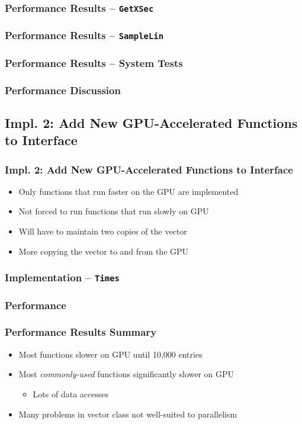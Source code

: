 \documentclass{beamer}
\newcommand{\textapprox}{\raisebox{0.5ex}{\texttildelow}}
\newcommand\pro{\item[$+$]}
\newcommand\con{\item[$-$]}
\begin{document}
\begin{frame}
\frametitle{Performance Results -- \texttt{GetXSec}}
\end{frame}

\begin{frame}
\frametitle{Performance Results -- \texttt{SampleLin}}
\end{frame}

\begin{frame}
\frametitle{Performance Results -- System Tests}
\end{frame}

\begin{frame}
\frametitle{Performance Discussion}
\end{frame}


\subsection{Impl. 2: Add New GPU-Accelerated Functions to Interface}
\begin{frame}
\frametitle{Impl. 2: Add New GPU-Accelerated Functions to Interface}
\begin{itemize}
\pro Only functions that run faster on the GPU are implemented
\pro Not forced to run functions that run slowly on GPU
\con Will have to maintain two copies of the vector
\con More copying the vector to and from the GPU
\end{itemize}
\end{frame}

\begin{frame}
\frametitle{Implementation -- \texttt{Times}}
\end{frame}

\subsubsection{Performance}
\begin{frame}
\frametitle{Performance Results Summary}
\begin{itemize}
\item Most functions slower on GPU until \textapprox 10,000 entries 
\item Most \emph{commonly-used} functions significantly slower on GPU
\begin{itemize}
\item Lots of data accesses
\end{itemize}
\item Many problems in vector class not well-suited to parallelism
\end{itemize}
\end{frame}
\end{document}
